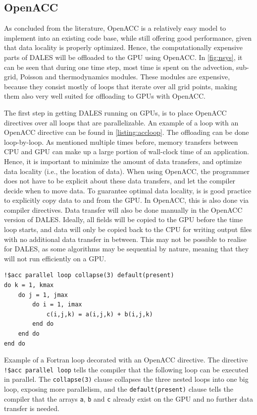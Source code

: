 \subsection{OpenACC}
As concluded from the literature, OpenACC is a relatively easy model to implement into an existing code base, while still offering good performance, given that data locality is properly optimized. Hence, the computationally expensive parts of DALES will be offloaded to the GPU using OpenACC. In \autoref{fig:nsys}, it can be seen that during one time step, most time is spent on the advection, sub-grid, Poisson and thermodynamics modules. These modules are expensive, because they consist mostly of loops that iterate over all grid points, making them also very well suited for offloading to GPUs with OpenACC. 

The first step in getting DALES running on GPUs, is to place OpenACC directives over all loops that are parallelizable. An example of a loop with an OpenACC directive can be found in \autoref{listing:accloop}. The offloading can be done loop-by-loop.
As mentioned multiple times before, memory transfers between CPU and GPU can make up a large portion of wall-clock time of an application. Hence, it is important to minimize the amount of data transfers, and optimize data locality (i.e., the location of data). When using OpenACC, the programmer does not have to be explicit about these data transfers, and let the compiler decide when to move data. To guarantee optimal data locality, is is good practice to explicitly copy data to and from the GPU. In OpenACC, this is also done via compiler directives. Data transfer will also be done manually in the OpenACC version of DALES. Ideally, all fields will be copied to the GPU before the time loop starts, and data will only be copied back to the CPU for writing output files with no additional data transfer in between. This may not be possible to realise for DALES, as some algorithms may be sequential by nature, meaning that they will not run efficiently on a GPU.

\begin{listing}[H]
\begin{verbatim}
!$acc parallel loop collapse(3) default(present)
do k = 1, kmax
    do j = 1, jmax
        do i = 1, imax
            c(i,j,k) = a(i,j,k) + b(i,j,k)
        end do
    end do
end do
\end{verbatim}
\caption{Example of a Fortran loop decorated with an OpenACC directive. The directive \texttt{!\$acc parallel loop} tells the compiler that the following loop can be executed in parallel. The \texttt{collapse(3)} clause collapses the three nested loops into one big loop, exposing more parallelism, and the \texttt{default(present)} clause tells the compiler that the arrays \texttt{a}, \texttt{b} and \texttt{c} already exist on the GPU and no further data transfer is needed.}
\label{listing:accloop}
\end{listing}

